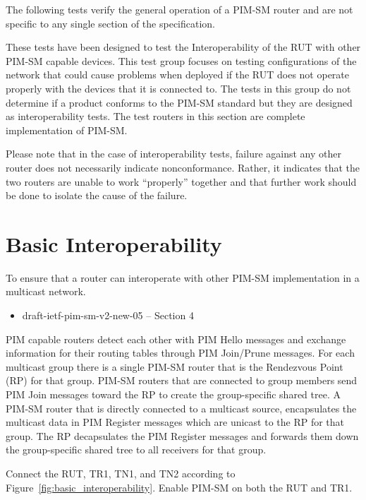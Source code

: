 \documentclass[11pt]{report}
\begin{document}
The following tests verify the general operation of a PIM-SM router and are
not specific to any single section of the specification.

These tests have been designed to test the Interoperability of the RUT with
other PIM-SM capable devices. This test group focuses on testing
configurations of the network that could cause problems when deployed if the
RUT does not operate properly with the devices that it is connected to. The
tests in this group do not determine if a product conforms to the PIM-SM
standard but they are designed as interoperability tests. The test routers in
this section are complete implementation of PIM-SM.

Please note that in the case of interoperability tests, failure against any
other router does not necessarily indicate nonconformance. Rather, it
indicates that the two routers are unable to work ``properly'' together and
that further work should be done to isolate the cause of the failure.

\newpage
\section{Basic Interoperability}

To ensure that a router can interoperate with other PIM-SM
implementation in a multicast network.

\begin{itemize}
  \item draft-ietf-pim-sm-v2-new-05 -- Section 4
\end{itemize}

PIM capable routers detect each other with PIM Hello
messages and exchange information for their routing tables through
PIM Join/Prune messages. For each multicast group there is a single PIM-SM
router that is the Rendezvous Point (RP) for that group. PIM-SM routers that
are connected to group members send PIM Join messages toward the RP to create
the group-specific shared tree. A PIM-SM router that is directly connected to
a multicast source, encapsulates the multicast data in PIM Register messages
which are unicast to the RP for that group. The RP decapsulates the
PIM Register messages and forwards them down the group-specific shared tree to
all receivers for that group.

Connect the RUT, TR1, TN1, and TN2 according to
Figure~\ref{fig:basic_interoperability}.
Enable PIM-SM on both the RUT and TR1.
\end{document}
